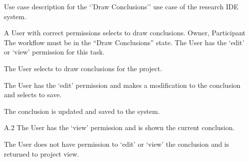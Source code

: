 \documentclass[document.tex]{subfiles}
\begin{document}
\begin{table}
  \centering
  \caption{Use case description for the `'Draw Conclusions'' use case of the research IDE system.}
  \label{tbl:use-case-draw-conclusions}

  \begin{usecase}
    A User with correct permissions selects to draw conclusions.
    Owner, Participant
    The workflow must be in the “Draw Conclusions” state. The User has the ‘edit’ or ‘view’ permission for this task.
    \ucnormal
    \begin{ucenum}
      \item The User selects to draw conclusions for the project.
      \item The User has the ‘edit’ permission and makes a modification to the conclusion and selects to save.
      \item The conclusion is updated and saved to the system.
    \end{ucenum}
    \begin{ucenum}
      \item [A.2] The User has the ‘view’ permission and is shown the current conclusion.
    \end{ucenum}
    The User does not have permission to ‘edit’ or ‘view’ the conclusion and is returned to project view.
  \end{usecase}
\end{table}


\FloatBarrier
\end{document}
